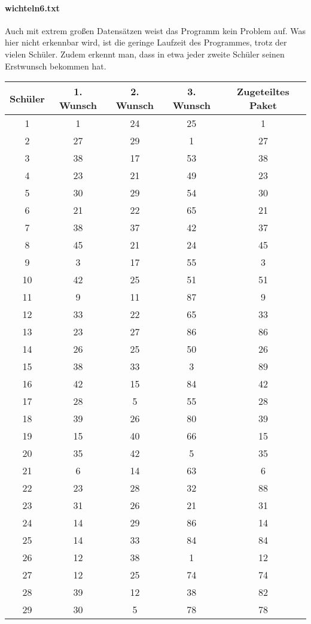 \documentclass[a4paper,10pt,ngerman]{scrartcl}
\begin{document}
\paragraph{wichteln6.txt}
Auch mit extrem großen Datensätzen weist das Programm kein Problem auf.
Was hier nicht erkennbar wird, ist die geringe Laufzeit des Programmes, trotz der vielen Schüler.
Zudem erkennt man, dass in etwa jeder zweite Schüler seinen Erstwunsch bekommen hat.
\begin{longtable}[c]{c|c|c|c|c}
    Schüler & 1. Wunsch & 2. Wunsch & 3. Wunsch & Zugeteiltes Paket \\
    \hline
    \endhead
    1 & 1 & 24 & 25 & 1 \\
    2 & 27 & 29 & 1 & 27 \\
    3 & 38 & 17 & 53 & 38 \\
    4 & 23 & 21 & 49 & 23 \\
    5 & 30 & 29 & 54 & 30 \\
    6 & 21 & 22 & 65 & 21 \\
    7 & 38 & 37 & 42 & 37 \\
    8 & 45 & 21 & 24 & 45 \\
    9 & 3 & 17 & 55 & 3 \\
    10 & 42 & 25 & 51 & 51 \\
    11 & 9 & 11 & 87 & 9 \\
    12 & 33 & 22 & 65 & 33 \\
    13 & 23 & 27 & 86 & 86 \\
    14 & 26 & 25 & 50 & 26 \\
    15 & 38 & 33 & 3 & 89 \\
    16 & 42 & 15 & 84 & 42 \\
    17 & 28 & 5 & 55 & 28 \\
    18 & 39 & 26 & 80 & 39 \\
    19 & 15 & 40 & 66 & 15 \\
    20 & 35 & 42 & 5 & 35 \\
    21 & 6 & 14 & 63 & 6 \\
    22 & 23 & 28 & 32 & 88 \\
    23 & 31 & 26 & 21 & 31 \\
    24 & 14 & 29 & 86 & 14 \\
    25 & 14 & 33 & 84 & 84 \\
    26 & 12 & 38 & 1 & 12 \\
    27 & 12 & 25 & 74 & 74 \\
    28 & 39 & 12 & 38 & 82 \\
    29 & 30 & 5 & 78 & 78 \\

\end{longtable}
\end{document}
